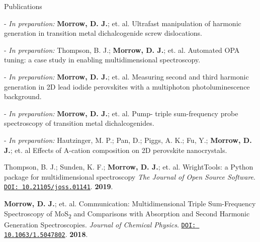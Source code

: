 \documentclass{resume} %
\begin{document}
\begin{rSection}{Publications}
	
\begin{etaremune}[topsep=0pt,itemsep=0pt,partopsep=0pt,parsep=0pt]
	
\item[-] \textit{In preparation:} \textbf{Morrow, D. J.}; et. al. %
Ultrafast manipulation of harmonic generation in transition metal dichalcogenide screw dislocations.
	
	
\item[-]  \textit{In preparation:} Thompson, B. J.;  \textbf{Morrow, D. J.}; et. al. %
Automated OPA tuning: a case study in enabling multidimensional spectroscopy.

\item[-] \textit{In preparation:} \textbf{Morrow, D. J.}; et. al. %
Measuring second and third harmonic generation in 2D lead iodide perovskites with a multiphoton photoluminescence background.
	
\item[-] \textit{In preparation:} \textbf{Morrow, D. J.}; et. al. %
Pump- triple sum-frequency probe spectroscopy of transition metal dichalcogenides.

\item[-] \textit{In preparation:} Hautzinger, M. P.; Pan, D.; Piggs, A. K.; Fu, Y.; \textbf{Morrow, D. J.};  et. al %
Effects of A-cation composition on 2D perovskite nanocrystals. 


\item Thompson, B. J.; Sunden, K. F.; \textbf{Morrow, D. J.}; et. al. %
WrightTools: a Python package for multidimensional spectroscopy \emph{The Journal of Open Source Software}. 
\href{http://doi.org/10.21105/joss.01141}{\texttt{DOI: 10.21105/joss.01141}}. \textbf{2019}.
	
\item \textbf{Morrow, D. J.}; et. al. %
Communication: Multidimensional Triple Sum-Frequency Spectroscopy of MoS\textsubscript{2} and Comparisons with Absorption and Second Harmonic Generation Spectroscopies. \emph{Journal of Chemical Physics}. \href{http://doi.org/10.1063/1.5047802}{\texttt{DOI: 10.1063/1.5047802}}. \textbf{2018}.
	

\end{etaremune}
\end{rSection}
\end{document}
